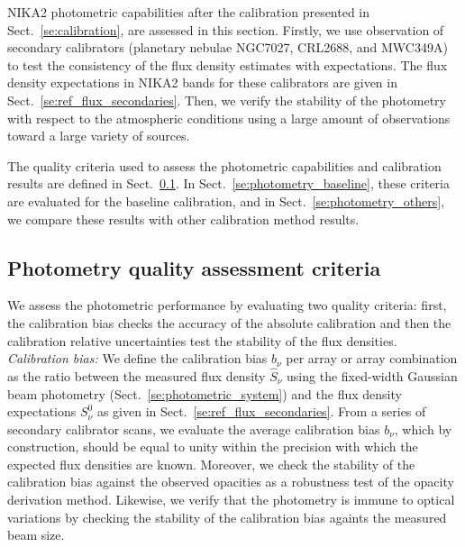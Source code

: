 %

NIKA2 photometric capabilities after the calibration presented in
Sect.~\ref{se:calibration}, are assessed in this section. Firstly,
we use observation of secondary calibrators (planetary nebulae NGC7027, CRL2688, and
MWC349A) to test the consistency of the flux density estimates with
expectations. The flux density expectations
in NIKA2 bands for these calibrators are given in
Sect.~\ref{se:ref_flux_secondaries}. Then,
we verify the stability of the photometry with
respect to the atmospheric conditions using a large amount of
observations toward a large variety of sources. 

The quality criteria used to assess the photometric
capabilities and calibration results are defined in
Sect.~\ref{se:photometry_criteria}.
In Sect.~\ref{se:photometry_baseline}, these criteria are evaluated
for the baseline calibration, and in Sect.~\ref{se:photometry_others},
we compare these results with other calibration method results. 


\subsection{Photometry quality assessment criteria}
\label{se:photometry_criteria}

We assess the photometric performance by evaluating two
quality criteria: first, the calibration bias checks the accuracy of
the absolute calibration and then the calibration relative
uncertainties test the stability of the flux densities. \\

\noindent \emph{Calibration bias: }We define the calibration bias
$b_{\nu}$ per array or array combination as
the ratio between the measured flux density $\hat{S}_{\nu}$ using the
fixed-width Gaussian beam photometry
(Sect.~\ref{se:photometric_system}) and the flux density
expectations $S^{0}_{\nu}$ as given in
Sect.~\ref{se:ref_flux_secondaries}. From a series of
secondary calibrator scans, we evaluate the average calibration bias
$b_{\nu}$, which by construction, should be equal to
unity within the precision with which the expected flux densities are
known. Moreover, we check the stability of the calibration bias against
the observed opacities as a robustness test of the
opacity derivation method. Likewise, we verify that the photometry is
immune to optical variations by checking the stability of the
calibration bias againts the measured beam size.\\

